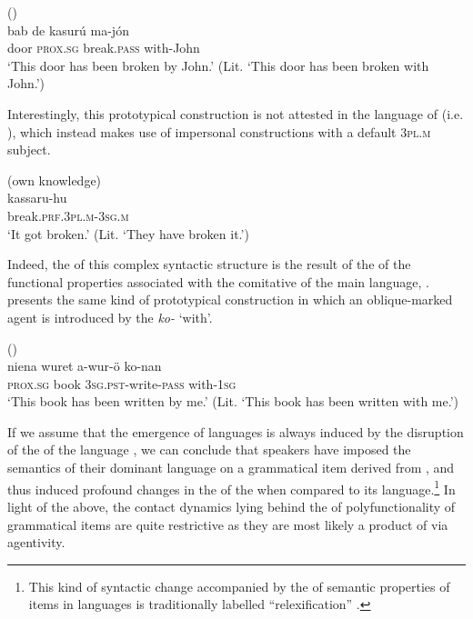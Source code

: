 \documentclass[output=paper]{langsci/langscibook}
\begin{document}
\ea\label{passive}
{  (\citealt[86]{Manfredi2017})}\\
\gll   bab de kasurú ma-jón \\
       door \textsc{prox.sg} break.\textsc{pass} with-John\\
\glt   `This door has been broken by John.' (Lit. ‘This door has been broken with John.’)
\z
 
Interestingly, this prototypical  construction is not attested in the  language of   (i.e.  ), which instead makes use of impersonal  constructions with a default \textsc{3pl.m} subject.

\ea
{  (own knowledge)}\\
\gll   kassaru-hu\\
       break.\textsc{prf.3pl.m-3sg.m}\\
\glt   `It got broken.' (Lit. ‘They have broken it.’) 
\z

Indeed, the  of this complex syntactic structure is the result of the  of the functional properties associated with the comitative  of the main  language, .  presents the same kind of prototypical  construction in which an oblique-marked agent is introduced by the  \textit{ko-} ‘with’.

\ea
{ (\citealt[65]{Owen1909})}\\
\gll   niena  wuret   a-wur-ö ko-nan \\
       \textsc{prox.sg} book \textsc{3sg.pst}-write-\textsc{pass} with-\textsc{1sg}\\
\glt   `This book has been written by me.' (Lit. ‘This book has been written with me.’)
\z

If we assume that the emergence of  languages is always induced by the disruption of the  of the  language \citep{Comrie2011}, we can conclude that  speakers have imposed the semantics of their dominant language on a grammatical item derived from , and thus induced profound changes in the  of the  when compared to its  language.\footnote{This kind of syntactic change accompanied by the  of semantic properties of  items in  languages is traditionally labelled ``relexification'' \citep{Lefebvre1998}.}  In light of the above, the contact dynamics lying behind the  of polyfunctionality of grammatical items are quite restrictive as they are most likely a product of  via  agentivity.\largerpage[2]
\end{document}
